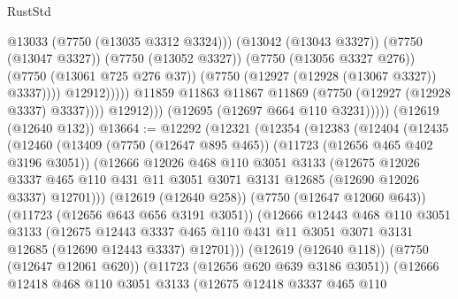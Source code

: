 \begin{lexlean}{RustStd}
\begin{coremodule}
                                    @13033
                                    (@7750 (@13035 @3312 @3324)))
                                  (@13042 (@13043 @3327))
                                  (@7750 (@13047 @3327))
                                  (@7750 (@13052 @3327))
                                  (@7750 (@13056 @3327 @276))
                                  (@7750 (@13061 @725 @276 @37))
                                  (@7750 (@12927 (@12928 (@13067 @3327)) @3337))))
                              @12912)))))
                    @11859
                    @11863
                    @11867
                    @11869
                    (@7750 (@12927 (@12928 @3337) @3337))))
                @12912)))
          (@12695 (@12697 @664 @110 @3231)))))
    (@12619 (@12640 @132))
@13664 := @12292
    (@12321
      (@12354
        (@12383
          (@12404
            (@12435
              (@12460
                (@13409
                  (@7750 (@12647 @895 @465))
                  (@11723 (@12656 @465 @402 @3196 @3051))
                  (@12666
                    @12026
                    @468
                    @110
                    @3051
                    @3133
                    (@12675
                      @12026
                      @3337
                      @465
                      @110
                      @431
                      @11
                      @3051
                      @3071
                      @3131
                      @12685
                      (@12690 @12026 @3337)
                      @12701)))
                (@12619 (@12640 @258))
                (@7750 (@12647 @12060 @643))
                (@11723 (@12656 @643 @656 @3191 @3051))
                (@12666
                  @12443
                  @468
                  @110
                  @3051
                  @3133
                  (@12675
                    @12443
                    @3337
                    @465
                    @110
                    @431
                    @11
                    @3051
                    @3071
                    @3131
                    @12685
                    (@12690 @12443 @3337)
                    @12701)))
              (@12619 (@12640 @118))
              (@7750 (@12647 @12061 @620))
              (@11723 (@12656 @620 @639 @3186 @3051))
              (@12666
                @12418
                @468
                @110
                @3051
                @3133
                (@12675
                  @12418
                  @3337
                  @465
                  @110

\end{coremodule}
\end{lexlean}
